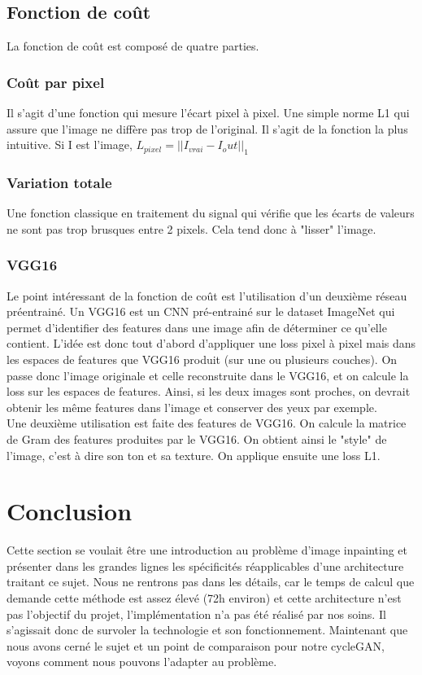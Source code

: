 \subsection{Fonction de coût}
La fonction de coût est composé de quatre parties.
\subsubsection{Coût par pixel}
Il s'agit d'une fonction qui mesure l'écart pixel à pixel. Une simple norme L1 qui assure que l'image ne diffère pas trop de l'original. Il s'agit de la fonction la plus intuitive. Si I est l'image, $L_{pixel} = ||I_{vrai} - {I_out}||_1$
\subsubsection{Variation totale}
Une fonction classique en traitement du signal qui vérifie que les écarts de valeurs ne sont pas trop brusques entre 2 pixels. Cela tend donc à "lisser" l'image.
\subsubsection{VGG16}
Le point intéressant de la fonction de coût est l'utilisation d'un deuxième réseau préentrainé. Un VGG16 est un CNN pré-entrainé sur le dataset ImageNet qui permet d'identifier des features dans une image afin de déterminer ce qu'elle contient. L'idée est donc tout d'abord d'appliquer une loss pixel à pixel mais dans les espaces de features que VGG16 produit (sur une ou plusieurs couches). On passe donc l'image originale et celle reconstruite dans le VGG16, et on calcule la loss sur les espaces de features. Ainsi, si les deux images sont proches, on devrait obtenir les même features dans l'image et conserver des yeux par exemple. \\
Une deuxième utilisation est faite des features de VGG16. On calcule la matrice de Gram des features produites par le VGG16. On obtient ainsi le "style" de l'image, c'est à dire son ton et sa texture. On applique ensuite une loss L1.

\section{Conclusion}
Cette section se voulait être une introduction au problème d'image inpainting et présenter dans les grandes lignes les spécificités réapplicables d'une architecture traitant ce sujet. Nous ne rentrons pas dans les détails, car le temps de calcul que demande cette méthode est assez élevé (72h environ) et cette architecture n'est pas l'objectif du projet, l'implémentation n'a pas été réalisé par nos soins. Il s'agissait donc de survoler la technologie et son fonctionnement. Maintenant que nous avons cerné le sujet et un point de comparaison pour notre cycleGAN, voyons comment nous pouvons l'adapter au problème.

